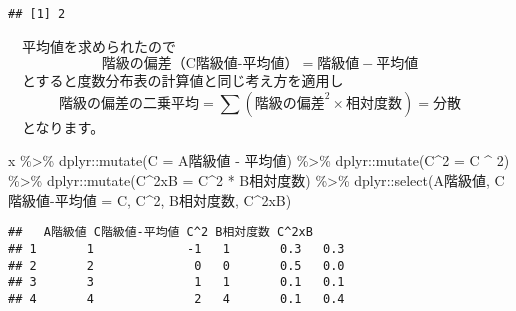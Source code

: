 \documentclass[
  12pt,
]{book}
\newenvironment{Shaded}{\begin{snugshade}}{\end{snugshade}}
\newcommand{\AttributeTok}[1]{\textcolor[rgb]{0.77,0.63,0.00}{#1}}
\newcommand{\DecValTok}[1]{\textcolor[rgb]{0.00,0.00,0.81}{#1}}
\newcommand{\FunctionTok}[1]{\textcolor[rgb]{0.00,0.00,0.00}{#1}}
\newcommand{\NormalTok}[1]{#1}
\newcommand{\OtherTok}[1]{\textcolor[rgb]{0.56,0.35,0.01}{#1}}
\newcommand{\SpecialCharTok}[1]{\textcolor[rgb]{0.00,0.00,0.00}{#1}}
\newcommand{\StringTok}[1]{\textcolor[rgb]{0.31,0.60,0.02}{#1}}
\begin{document}
\begin{verbatim}
## [1] 2
\end{verbatim}

　平均値を求められたので \[\mbox{階級の偏差（C階級値-平均値）} = \mbox{階級値} - \mbox{平均値}\] 　とすると度数分布表の計算値と同じ考え方を適用し \[\mbox{階級の偏差の二乗平均} = \sum{(\mbox{階級の偏差}^2 \times \mbox{相対度数})} = \mbox{分散}\] 　となります。

\begin{Shaded}
\begin{Highlighting}[]
\NormalTok{x }\SpecialCharTok{\%\textgreater{}\%} 
\NormalTok{  dplyr}\SpecialCharTok{::}\FunctionTok{mutate}\NormalTok{(}\StringTok{\textasciigrave{}}\AttributeTok{C}\StringTok{\textasciigrave{}} \OtherTok{=} \StringTok{\textasciigrave{}}\AttributeTok{A階級値}\StringTok{\textasciigrave{}} \SpecialCharTok{{-}} \StringTok{\textasciigrave{}}\AttributeTok{平均値}\StringTok{\textasciigrave{}}\NormalTok{) }\SpecialCharTok{\%\textgreater{}\%} 
\NormalTok{  dplyr}\SpecialCharTok{::}\FunctionTok{mutate}\NormalTok{(}\StringTok{\textasciigrave{}}\AttributeTok{C\^{}2}\StringTok{\textasciigrave{}} \OtherTok{=} \StringTok{\textasciigrave{}}\AttributeTok{C}\StringTok{\textasciigrave{}} \SpecialCharTok{\^{}} \DecValTok{2}\NormalTok{) }\SpecialCharTok{\%\textgreater{}\%} 
\NormalTok{  dplyr}\SpecialCharTok{::}\FunctionTok{mutate}\NormalTok{(}\StringTok{\textasciigrave{}}\AttributeTok{C\^{}2xB}\StringTok{\textasciigrave{}} \OtherTok{=} \StringTok{\textasciigrave{}}\AttributeTok{C\^{}2}\StringTok{\textasciigrave{}} \SpecialCharTok{*} \StringTok{\textasciigrave{}}\AttributeTok{B相対度数}\StringTok{\textasciigrave{}}\NormalTok{) }\SpecialCharTok{\%\textgreater{}\%} 
\NormalTok{  dplyr}\SpecialCharTok{::}\FunctionTok{select}\NormalTok{(}\StringTok{\textasciigrave{}}\AttributeTok{A階級値}\StringTok{\textasciigrave{}}\NormalTok{, }\StringTok{\textasciigrave{}}\AttributeTok{C階級値{-}平均値}\StringTok{\textasciigrave{}} \OtherTok{=} \StringTok{\textasciigrave{}}\AttributeTok{C}\StringTok{\textasciigrave{}}\NormalTok{, }\StringTok{\textasciigrave{}}\AttributeTok{C\^{}2}\StringTok{\textasciigrave{}}\NormalTok{, }\StringTok{\textasciigrave{}}\AttributeTok{B相対度数}\StringTok{\textasciigrave{}}\NormalTok{, }\StringTok{\textasciigrave{}}\AttributeTok{C\^{}2xB}\StringTok{\textasciigrave{}}\NormalTok{)}
\end{Highlighting}
\end{Shaded}

\begin{verbatim}
##   A階級値 C階級値-平均値 C^2 B相対度数 C^2xB
## 1       1             -1   1       0.3   0.3
## 2       2              0   0       0.5   0.0
## 3       3              1   1       0.1   0.1
## 4       4              2   4       0.1   0.4
\end{verbatim}
\end{document}
